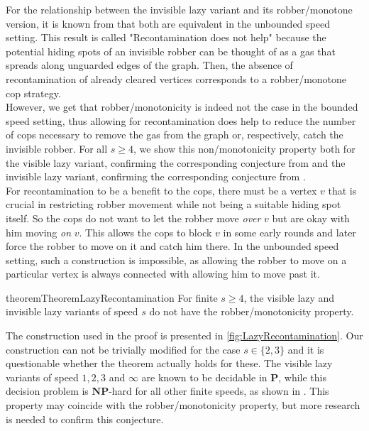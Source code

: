 For the relationship between the invisible lazy variant and its robber\-/monotone version, it is known from \cite{dendris1997fugitive} that both are equivalent in the unbounded speed setting. This result is called "Recontamination does not help" because the potential hiding spots of an invisible robber can be thought of as a gas that spreads along unguarded edges of the graph. Then, the absence of recontamination of already cleared vertices corresponds to a robber\-/monotone cop strategy. \\
However, we get that robber\-/monotonicity is indeed not the case in the bounded speed setting, thus allowing for recontamination does help to reduce the number of cops necessary to remove the gas from the graph or, respectively, catch the invisible robber.
For all $s\geq 4$, we show this non\-/monotonicity property both for the visible lazy variant, confirming the corresponding conjecture from \cite{doi:10.1137/090780006} and the invisible lazy variant, confirming the corresponding conjecture from \cite{dendris1997fugitive}. \\
For recontamination to be a benefit to the cops, there must be a vertex $v$ that is crucial in restricting robber movement while not being a suitable hiding spot itself.
So the cops do not want to let the robber move \emph{over} $v$ but are okay with him moving \emph{on} $v$.
This allows the cops to block $v$ in some early rounds and later force the robber to move on it and catch him there.
In the unbounded speed setting, such a construction is impossible, as allowing the robber to move on a particular vertex is always connected with allowing him to move past it.
\begin{restatable}{theorem}{TheoremLazyRecontamination}
For finite $s\geq 4$, the visible lazy and invisible lazy variants of speed $s$ do not have the robber\-/monotonicity property.
\end{restatable}
The construction used in the proof is presented in \cref{fig:LazyRecontamination}. Our construction can not be trivially modified for the case $s\in \{2,3\}$ and it is questionable whether the theorem actually holds for these. The visible lazy variants of speed $1,2,3$ and $\infty$ are known to be decidable in $\mathbf{P}$, while this decision problem is $\mathbf{NP}$-hard for all other finite speeds, as shown in \cite{doi:10.1137/090780006}. This property may coincide with the robber\-/monotonicity property, but more research is needed to confirm this conjecture.  



